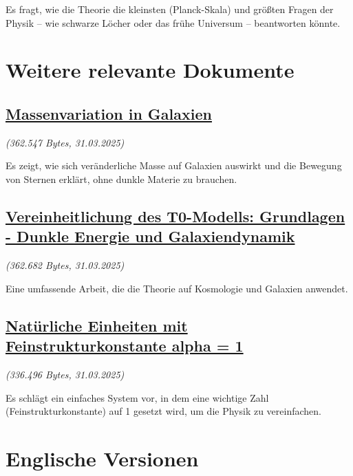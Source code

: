\documentclass[a4paper,12pt]{article}
\newcommand{\repobase}{https://github.com/jpascher/T0-Time-Mass-Duality/tree/main/2/}
\begin{document}
	Es fragt, wie die Theorie die kleinsten (Planck-Skala) und größten Fragen der Physik – wie schwarze Löcher oder das frühe Universum – beantworten könnte.
	
	\section{Weitere relevante Dokumente}
	
	\subsection{\small\href{\repobase/pdf/Deutsch/Massenvariation in Galaxien.pdf}{Massenvariation in Galaxien}}
	\textit{(362.547 Bytes, 31.03.2025)}
	
	Es zeigt, wie sich veränderliche Masse auf Galaxien auswirkt und die Bewegung von Sternen erklärt, ohne dunkle Materie zu brauchen.
	
	\subsection{\small\href{\repobase/pdf/Deutsch/Vereinheitlichung des T0-Modells Grundlagen - Dunkle Energie und Galaxiendynamik.pdf}{Vereinheitlichung des T0-Modells: Grundlagen - Dunkle Energie und Galaxiendynamik}}
	\textit{(362.682 Bytes, 31.03.2025)}
	
	Eine umfassende Arbeit, die die Theorie auf Kosmologie und Galaxien anwendet.
	
	\subsection{\small\href{\repobase/pdf/Deutsch/Natürliche Einheiten mit Feinstrukturkonstante alpha = 1.pdf}{Natürliche Einheiten mit Feinstrukturkonstante alpha = 1}}
	\textit{(336.496 Bytes, 31.03.2025)}
	
	Es schlägt ein einfaches System vor, in dem eine wichtige Zahl (Feinstrukturkonstante) auf 1 gesetzt wird, um die Physik zu vereinfachen.
	
	\section{Englische Versionen}
	
\end{document}
